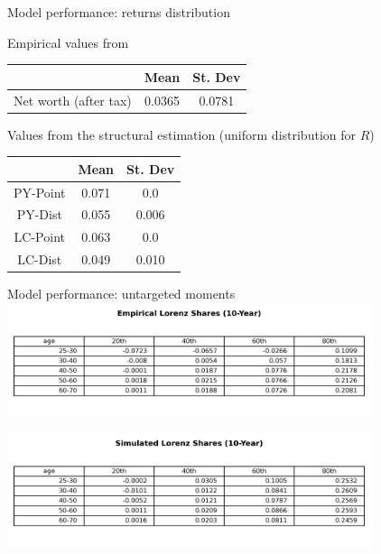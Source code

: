 \documentclass{beamer}
\begin{document}

\begin{frame}{Model performance: returns distribution}
\centering

\begin{flushleft}
\par Empirical values from \cite{aflgdmlp20}
\end{flushleft}
    \begin{tabular}{|c|c|c|}
\hline
& Mean & St. Dev \\
\hline
Net worth (after tax) & 0.0365 & 0.0781  \\
\hline
\end{tabular}

\begin{flushleft}
\par Values from the structural estimation (uniform distribution for $R$)
\end{flushleft}
    \begin{tabular}{|c|c|c|}
\hline
& Mean & St. Dev \\
\hline
PY-Point & 0.071 & 0.0  \\
PY-Dist & 0.055  &  0.006  \\
LC-Point & 0.063 & 0.0  \\
LC-Dist & 0.049  &  0.010  \\
\hline
\end{tabular}

\end{frame}

\begin{frame}{Model performance: untargeted moments}
\centering
\includegraphics[width=0.8\textwidth]{Tables/Emp_Lorenz_10yr_LCrrDistNetWorth.png}


\includegraphics[width=0.8\textwidth]{Tables/Sim_Lorenz_10yr_LCrrDistNetWorth.png}

\end{frame}
\end{document}

